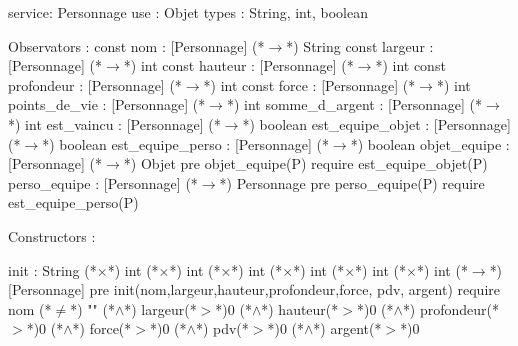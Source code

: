 \documentclass[a4paper, 11pt]{report}
\begin{document}
\begin{Spe}
service: Personnage
use : Objet
types : String, int, boolean

Observators : 
	const nom : [Personnage] (*$\rightarrow$*) String
	const largeur : [Personnage] (*$\rightarrow$*) int
	const hauteur : [Personnage] (*$\rightarrow$*) int
	const profondeur : [Personnage] (*$\rightarrow$*) int
	const force : [Personnage] (*$\rightarrow$*) int 
	points_de_vie : [Personnage] (*$\rightarrow$*) int
	somme_d_argent : [Personnage] (*$\rightarrow$*) int 
	est_vaincu : [Personnage] (*$\rightarrow$*) boolean 
	est_equipe_objet : [Personnage] (*$\rightarrow$*) boolean
        est_equipe_perso : [Personnage] (*$\rightarrow$*) boolean 
	objet_equipe : [Personnage] (*$\rightarrow$*) Objet
		pre objet_equipe(P) require est_equipe_objet(P)
        perso_equipe : [Personnage] (*$\rightarrow$*) Personnage
		pre perso_equipe(P) require est_equipe_perso(P) 

Constructors : 

	init : String (*$\times$*) int (*$\times$*) int (*$\times$*) int (*$\times$*) int (*$\times$*) int (*$\times$*) int (*$\rightarrow$*) [Personnage]
		pre init(nom,largeur,hauteur,profondeur,force, pdv, argent) require nom (*$\neq$*) "" (*$\land$*) largeur(*$>$*)0 (*$\land$*) hauteur(*$>$*)0 (*$\land$*) profondeur(*$>$*)0 (*$\land$*) force(*$>$*)0 (*$\land$*) pdv(*$>$*)0 (*$\land$*) argent(*$>$*)0 


\end{Spe}
\end{document}
